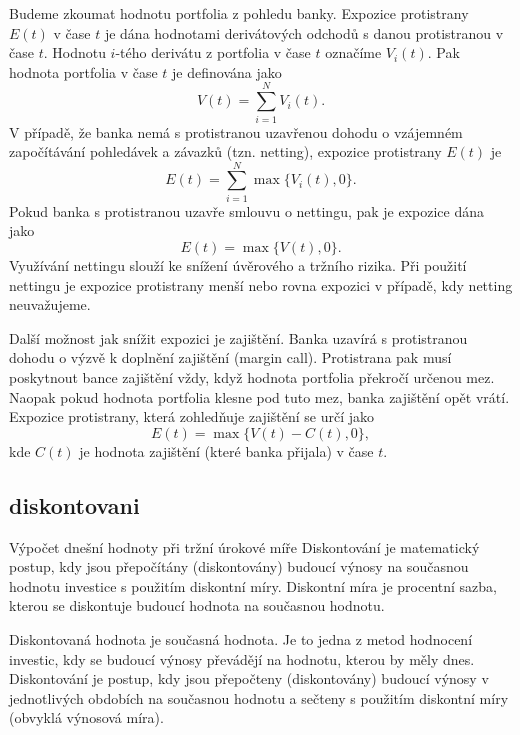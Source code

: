 \documentclass[a4paper,12pt]{report}
\theoremstyle{definition} \newtheorem{definice}[veta]{Definice}
\theoremstyle{remark}
\begin{document}
Budeme zkoumat hodnotu portfolia z pohledu banky.
Expozice protistrany $E(t)$ v čase $t$ je dána hodnotami derivátových odchodů s danou protistranou v čase $t$.
Hodnotu $i$-tého derivátu z portfolia v čase $t$  označíme $V_i(t)$.
Pak hodnota portfolia v čase $t$ je definována jako
\begin{equation}
V(t)=\sum_{i=1}^N V_i(t).
\end{equation}
V případě, že banka nemá s protistranou uzavřenou dohodu o vzájemném započítávání pohledávek a závazků (tzn. netting), expozice protistrany $E(t)$ je 
\begin{equation}
E(t)=\sum_{i=1}^N\max\{V_i(t),0\}.
\end{equation}
Pokud banka s protistranou uzavře smlouvu o nettingu, pak je expozice dána jako
\begin{equation}
E(t)=\max\{V(t),0\}.
\end{equation}
Využívání nettingu slouží ke snížení úvěrového a tržního rizika. 
Při použití nettingu je expozice protistrany menší nebo rovna expozici v případě, kdy netting neuvažujeme. 

Další možnost jak snížit expozici je zajištění.
Banka uzavírá s protistranou dohodu o výzvě k doplnění zajištění (margin call).
Protistrana pak musí poskytnout bance zajištění vždy, když hodnota portfolia překročí určenou mez.
Naopak pokud hodnota portfolia klesne pod tuto mez, banka zajištění opět vrátí.
Expozice protistrany, která zohledňuje zajištění se určí jako
\begin{equation}
E(t)=\max\{V(t)-C(t),0\},
\end{equation}
kde $C(t)$ je hodnota zajištění (které banka přijala) v čase $t$.  

\subsection{diskontovani}
Výpočet dnešní hodnoty při tržní úrokové míře
Diskontování je matematický postup, kdy jsou přepočítány (diskontovány) budoucí výnosy na současnou hodnotu investice s použitím diskontní míry.
Diskontní míra je procentní sazba, kterou se diskontuje budoucí hodnota na současnou hodnotu.

Diskontovaná hodnota je současná hodnota. Je to jedna z metod hodnocení investic, kdy se budoucí výnosy převádějí na hodnotu, kterou by měly dnes.
Diskontování je postup, kdy jsou přepočteny (diskontovány) budoucí výnosy v jednotlivých obdobích na současnou hodnotu a sečteny s použitím diskontní míry (obvyklá výnosová míra).
\end{document}
